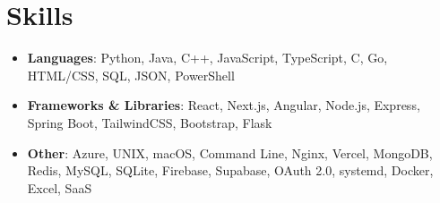 \documentclass[letterpaper,10pt]{article}
\begin{document}
\section{Skills}
\begin{itemize}[
  leftmargin=0in,
  label={},
  itemsep=0pt,
  topsep=0pt,
  parsep=0pt,
  partopsep=0pt
]
  \item {\fontsize{8.5}{10}\selectfont
    \textbf{Languages}: Python, Java, C++, JavaScript, TypeScript, C, Go, HTML/CSS, SQL, JSON, PowerShell
  }\vspace{-7pt}
  \item {\fontsize{8.5}{10}\selectfont
    \textbf{Frameworks \& Libraries}: React, Next.js, Angular, Node.js, Express, Spring Boot, TailwindCSS, Bootstrap, Flask
  }\vspace{-7pt}
  \item {\fontsize{8.5}{10}\selectfont
    \textbf{Other}: Azure, UNIX, macOS, Command Line, Nginx, Vercel, MongoDB, Redis, MySQL, SQLite, Firebase, Supabase, OAuth 2.0, systemd, Docker, Excel, SaaS
  }
\end{itemize}
\end{document}
